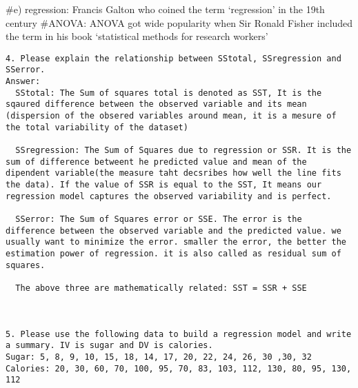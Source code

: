 \documentclass[]{article}
\begin{document}
\#e) regression: Francis Galton who coined the term `regression' in the
19th century \#ANOVA: ANOVA got wide popularity when Sir Ronald Fisher
included the term in his book `statistical methods for research workers'

\begin{verbatim}
4. Please explain the relationship between SStotal, SSregression and SSerror.
Answer:
  SStotal: The Sum of squares total is denoted as SST, It is the sqaured difference between the observed variable and its mean (dispersion of the obsered variables around mean, it is a mesure of the total variability of the dataset)
    
  SSregression: The Sum of Squares due to regression or SSR. It is the sum of difference betweent he predicted value and mean of the dipendent variable(the measure taht decsribes how well the line fits the data). If the value of SSR is equal to the SST, It means our regression model captures the observed variability and is perfect. 
    
  SSerror: The Sum of Squares error or SSE. The error is the difference between the observed variable and the predicted value. we usually want to minimize the error. smaller the error, the better the estimation power of regression. it is also called as residual sum of squares.
    
  The above three are mathematically related: SST = SSR + SSE
    
    

5. Please use the following data to build a regression model and write a summary. IV is sugar and DV is calories.
Sugar: 5, 8, 9, 10, 15, 18, 14, 17, 20, 22, 24, 26, 30 ,30, 32
Calories: 20, 30, 60, 70, 100, 95, 70, 83, 103, 112, 130, 80, 95, 130, 112
\end{verbatim}
\end{document}
